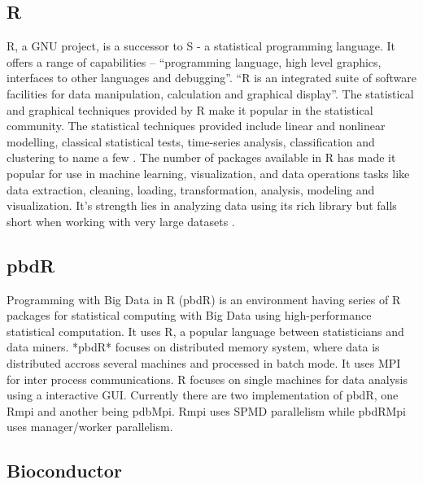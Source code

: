 \subsection{R}

    R, a GNU project, is a successor to S - a statistical programming
    language. It offers a range of capabilities – ``programming
    language, high level graphics, interfaces to other languages and
    debugging''. ``R is an integrated suite of software facilities for
    data manipulation, calculation and graphical display''. The
    statistical and graphical techniques provided by R make it popular
    in the statistical community. The statistical techniques provided
    include linear and nonlinear modelling, classical statistical
    tests, time-series analysis, classification and clustering to name
    a few \cite{www-R}. The number of packages available in R has
    made it popular for use in machine learning, visualization, and
    data operations tasks like data extraction, cleaning, loading,
    transformation, analysis, modeling and visualization. It's
    strength lies in analyzing data using its rich library but falls
    short when working with very large datasets \cite{book-R}.
    
\subsection{pbdR}

    Programming with Big Data in R (pbdR) \cite{www-pbdR} is an
    environment having series of R packages for statistical computing
    with Big Data using high-performance statistical computation. It
    uses R, a popular language between statisticians and data
    miners. *pbdR* focuses on distributed memory system, where data is
    distributed accross several machines and processed in batch
    mode. It uses MPI for inter process communications. R focuses on
    single machines for data analysis using a interactive
    GUI. Currently there are two implementation of pbdR, one Rmpi and
    another being pdbMpi.  Rmpi uses SPMD parallelism while pbdRMpi
    uses manager/worker parallelism.

\subsection{Bioconductor \cv}

